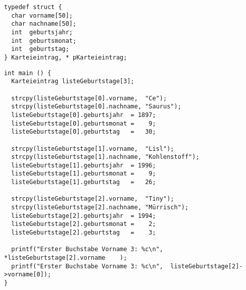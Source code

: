\begin{codebox}
\begin{verbatim}
typedef struct {
  char vorname[50];
  char nachname[50];
  int  geburtsjahr;
  int  geburtsmonat;
  int  geburtstag;
} Karteieintrag, * pKarteieintrag;
\end{verbatim}
\end{codebox}
%
\begin{codebox}[]
\begin{verbatim}
int main () {
  Karteieintrag listeGeburtstage[3];

  strcpy(listeGeburtstage[0].vorname,  "Ce");
  strcpy(listeGeburtstage[0].nachname, "Saurus");
  listeGeburtstage[0].geburtsjahr  = 1897;
  listeGeburtstage[0].geburtsmonat =    9;
  listeGeburtstage[0].geburtstag   =   30;
  
  strcpy(listeGeburtstage[1].vorname,  "Lisl");
  strcpy(listeGeburtstage[1].nachname, "Kohlenstoff");
  listeGeburtstage[1].geburtsjahr  = 1996;
  listeGeburtstage[1].geburtsmonat =    9;
  listeGeburtstage[1].geburtstag   =   26;
  
  strcpy(listeGeburtstage[2].vorname,  "Tiny");
  strcpy(listeGeburtstage[2].nachname, "Mürrisch");
  listeGeburtstage[2].geburtsjahr  = 1994;
  listeGeburtstage[2].geburtsmonat =    2;
  listeGeburtstage[2].geburtstag   =    3;
    
  printf("Erster Buchstabe Vorname 3: %c\n", *listeGeburtstage[2].vorname    );
  printf("Erster Buchstabe Vorname 3: %c\n",  listeGeburtstage[2]->vorname[0]);
}
\end{verbatim}
\end{codebox}

